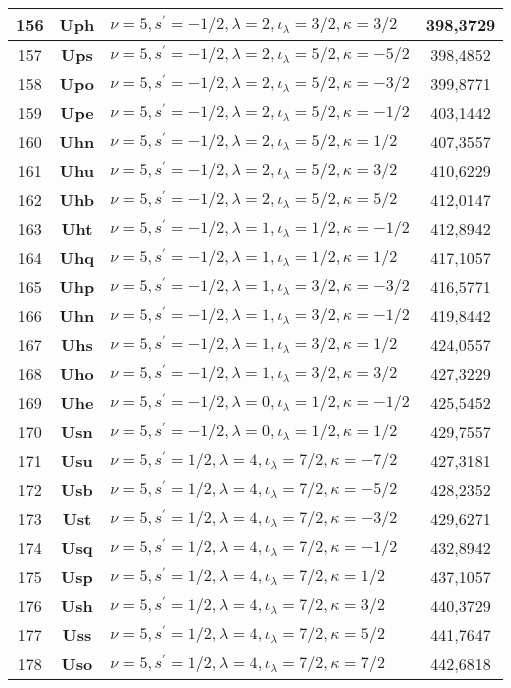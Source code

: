 \begin{center}
{\begin{tabular}{|c|c|l|c|}
156 & \textbf{Uph}& $\nu=5,s^\prime=-1/2,\lambda=2,\iota_\lambda=3/2,\kappa=3/2$ &  398,3729\\
\hline
157 & \textbf{Ups}& $\nu=5,s^\prime=-1/2,\lambda=2,\iota_\lambda=5/2,\kappa=-5/2$ &  398,4852\\
158 & \textbf{Upo}& $\nu=5,s^\prime=-1/2,\lambda=2,\iota_\lambda=5/2,\kappa=-3/2$ &  399,8771\\
159 & \textbf{Upe}& $\nu=5,s^\prime=-1/2,\lambda=2,\iota_\lambda=5/2,\kappa=-1/2$ &  403,1442\\
160 & \textbf{Uhn}& $\nu=5,s^\prime=-1/2,\lambda=2,\iota_\lambda=5/2,\kappa=1/2$ &  407,3557\\
161 & \textbf{Uhu}& $\nu=5,s^\prime=-1/2,\lambda=2,\iota_\lambda=5/2,\kappa=3/2$ &  410,6229\\
162 & \textbf{Uhb}& $\nu=5,s^\prime=-1/2,\lambda=2,\iota_\lambda=5/2,\kappa=5/2$ &  412,0147\\
\hline
163 & \textbf{Uht}& $\nu=5,s^\prime=-1/2,\lambda=1,\iota_\lambda=1/2,\kappa=-1/2$ &  412,8942\\
164 & \textbf{Uhq}& $\nu=5,s^\prime=-1/2,\lambda=1,\iota_\lambda=1/2,\kappa=1/2$ &  417,1057\\
\hline
165 & \textbf{Uhp}& $\nu=5,s^\prime=-1/2,\lambda=1,\iota_\lambda=3/2,\kappa=-3/2$ &  416,5771\\
166 & \textbf{Uhn}& $\nu=5,s^\prime=-1/2,\lambda=1,\iota_\lambda=3/2,\kappa=-1/2$ &  419,8442\\
167 & \textbf{Uhs}& $\nu=5,s^\prime=-1/2,\lambda=1,\iota_\lambda=3/2,\kappa=1/2$ &  424,0557\\
168 & \textbf{Uho}& $\nu=5,s^\prime=-1/2,\lambda=1,\iota_\lambda=3/2,\kappa=3/2$ &  427,3229\\
\hline
169 & \textbf{Uhe}& $\nu=5,s^\prime=-1/2,\lambda=0,\iota_\lambda=1/2,\kappa=-1/2$ &  425,5452\\
170 & \textbf{Usn}& $\nu=5,s^\prime=-1/2,\lambda=0,\iota_\lambda=1/2,\kappa=1/2$ &  429,7557\\
\hline
171 & \textbf{Usu}& $\nu=5,s^\prime=1/2,\lambda=4,\iota_\lambda=7/2,\kappa=-7/2$ &  427,3181\\
172 & \textbf{Usb}& $\nu=5,s^\prime=1/2,\lambda=4,\iota_\lambda=7/2,\kappa=-5/2$ &  428,2352\\
173 & \textbf{Ust}& $\nu=5,s^\prime=1/2,\lambda=4,\iota_\lambda=7/2,\kappa=-3/2$ &  429,6271\\
174 & \textbf{Usq}& $\nu=5,s^\prime=1/2,\lambda=4,\iota_\lambda=7/2,\kappa=-1/2$ &  432,8942\\
175 & \textbf{Usp}& $\nu=5,s^\prime=1/2,\lambda=4,\iota_\lambda=7/2,\kappa=1/2$ &  437,1057\\
176 & \textbf{Ush}& $\nu=5,s^\prime=1/2,\lambda=4,\iota_\lambda=7/2,\kappa=3/2$ &  440,3729\\
177 & \textbf{Uss}& $\nu=5,s^\prime=1/2,\lambda=4,\iota_\lambda=7/2,\kappa=5/2$ &  441,7647\\
178 & \textbf{Uso}& $\nu=5,s^\prime=1/2,\lambda=4,\iota_\lambda=7/2,\kappa=7/2$ &  442,6818\\
\hline
\end{tabular}
}
\end{center}
